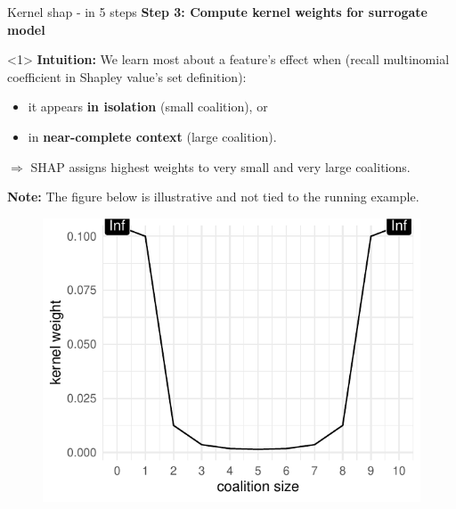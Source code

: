 \documentclass[11pt,compress,t,notes=noshow, aspectratio=169, xcolor=table]{beamer}
\begin{document}
\begin{frame}{Kernel shap - in 5 steps}
\textbf{Step 3: Compute kernel weights for surrogate model}\\\medskip

\begin{onlyenv}<1>
\textbf{Intuition:}  
We learn most about a feature’s effect when (recall multinomial coefficient in Shapley value's set definition):
\begin{itemize}
  \item it appears \textbf{in isolation} (small coalition), or
  \item in \textbf{near-complete context} (large coalition).
\end{itemize}
\(\Rightarrow\) SHAP assigns highest weights to very small and very large coalitions.

\medskip
\textbf{Note:} The figure below is illustrative and not tied to the running example.

\begin{figure}
    \centering
    \includegraphics[width=0.5\columnwidth]{figure_man/kernel-weights.pdf}
\end{figure}
\end{onlyenv}



\end{frame}
\end{document}
